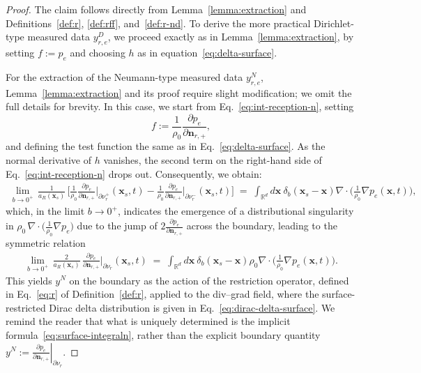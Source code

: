 \documentclass[11pt,reqno]{amsart}
\theoremstyle{remark}
\theoremstyle{italic_lemma}
\newcommand{\bx}{\boldsymbol{x}}
\newcommand{\bn}{\boldsymbol{n}}
\begin{document}
\begin{proof}
The claim follows directly from Lemma~\ref{lemma:extraction} and Definitions~\ref{def:r}, \ref{def:rff}, and~\ref{def:r-nd}. To derive the more practical Dirichlet-type measured data \(y_{r,e}^D\), we proceed exactly as in Lemma~\ref{lemma:extraction}, by setting \(f := p_e\) and choosing \(h\) as in equation~\ref{eq:delta-surface}. 

\noindent
For the extraction of the Neumann-type measured data $y_{r,e}^N$, Lemma~\ref{lemma:extraction} and its proof require slight modification; we omit the full details for brevity. In this case, we start from Eq.~\eqref{eq:int-reception-n}, setting 
\[
f := \frac{1}{\rho_0} \frac{\partial p_e}{\partial \bn_{r,+}},
\]
and defining the test function the same as in Eq.~\eqref{eq:delta-surface}. As the normal derivative of $h$ vanishes, the second term on the right-hand side of Eq.~\eqref{eq:int-reception-n} drops out. Consequently, we obtain:
\begin{align}  \label{eq:surface-inregral0}
  \lim_{b \to 0^+} \, \frac{1}{a_R(\bx_s)}\, \Big[ \frac{1}{\rho_0} \frac{\partial p_e}{\partial \bn_{r,+}} \Big|_{\partial \nu_r^+} (\bx_s, t)  - \frac{1}{\rho_0} \frac{\partial p_e}{\partial \bn_{r,+}}\Big|_{\partial \nu_r^-} (\bx_s, t) \Big]  \;=\;   \int_{\mathbb{R}^d} d\bx \ \delta_b(\bx_s - \bx)  \nabla \cdot \Big( \frac{1}{\rho_0} \nabla p_e  ( \bx , t) \Big) ,
\end{align}
which, in the limit \( b \to 0^+ \), indicates the emergence of a distributional singularity in 
\( \rho_0 \, \nabla \cdot \!\big( \tfrac{1}{\rho_0} \nabla p_e \big) \)  due to the jump of \( 2 \tfrac{\partial  p_e}{\partial \bn_{r,+}} \) across the boundary, leading to the symmetric relation
\begin{align} \label{eq:surface-integraln}
\lim_{b \to 0^+} \, \frac{2}{a_R(\bx_s)}\,  \tfrac{\partial  p_e}{\partial \bn_{r,+}} \Big|_{\partial \nu_r}  (\bx_s, t) \;=\;  \int_{\mathbb{R}^d} d\bx \ \delta_b(\bx_s - \bx)  \rho_0 \nabla \cdot \Big( \frac{1}{\rho_0} \nabla p_e( \bx , t)  \Big).
\end{align}
This yields \( y^N \) on the boundary as the action of the restriction operator, defined in Eq.~\eqref{eq:r} of Definition~\ref{def:r}, applied to the div--grad field, where the surface-restricted Dirac delta distribution is given in Eq.~\eqref{eq:dirac-delta-surface}. We remind the reader that what is uniquely determined is the implicit formula~\eqref{eq:surface-integraln}, rather than the explicit boundary quantity \( y^N := \left. \tfrac{\partial p_e}{\partial \bn_{r,+}} \right|_{\partial \nu_r} \).





\end{proof}
\end{document}
